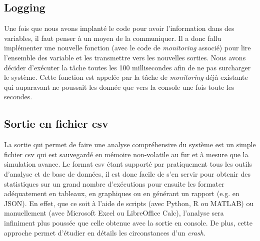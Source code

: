 \documentclass[journal]{IEEEtran}
\begin{document}
\subsection{Logging}

Une fois que nous avons implanté le code pour avoir l'information dans des variables, il faut penser à un moyen de la communiquer. Il a donc fallu implémenter une nouvelle fonction (avec le code de \textit{monitoring} associé) pour lire l'ensemble des variable et les transmettre vers les nouvelles sorties. Nous avons décider d'exécuter la tâche toutes les 100 millisecondes afin de ne pas surcharger le système. Cette fonction est appelée par la tâche de \textit{monitoring} déjà existante qui auparavant ne poussait les donnée que vers la console une fois toute les secondes.

\subsection{Sortie en fichier csv}

La sortie qui permet de faire une analyse compréhensive du système est un simple fichier csv qui est sauvegardé en mémoire non-volatile au fur et à mesure que la simulation avance. Le format csv étant supporté par pratiquement tous les outils d'analyse et de base de données, il est donc facile de s'en servir pour obtenir des statistiques sur un grand nombre d'exécutions pour ensuite les formater adéquatement en tableaux, en graphiques ou en générant un rapport (e.g. en JSON). En effet, que ce soit à l'aide de scripts (avec Python, R ou MATLAB) ou manuellement (avec Microsoft Excel ou LibreOffice Calc), l'analyse sera infiniment plus poussée que celle obtenue avec la sortie en console. De plus, cette approche permet d'étudier en détails les circonstances d'un \textit{crash}.
 
\end{document}

